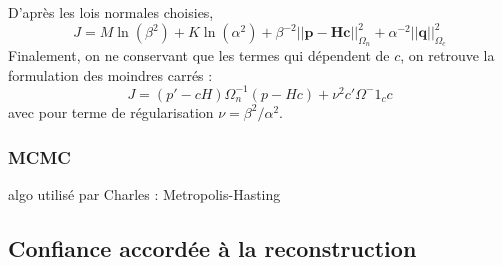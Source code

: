 D'après les lois normales choisies, 
\begin{equation}
J=M\ln(\beta^2) + K\ln(\alpha^2) +\beta^{-2}||\bm{p}-\bm{Hc}||^2_{\Omega_n}+\alpha^{-2}||\bm{q}||^2_{\Omega_c}
\end{equation}
Finalement, on ne conservant que les termes qui dépendent de $c$, on retrouve la formulation des moindres carrés : 
\begin{equation}
 J = (p'-cH)\Omega^{-1}_n(p-Hc) + \nu^2c'\Omega^-1_c c
\end{equation}
avec pour terme de régularisation $\nu = \beta^2/\alpha^2$.





\subsubsection{MCMC}
algo utilisé par Charles : Metropolis-Hasting


\subsection{Confiance accordée à la reconstruction}

	
